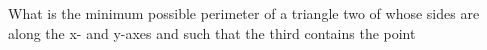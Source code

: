 What is the minimum possible perimeter of a triangle two of whose sides are along the x- and y-axes and such that the third contains the point 